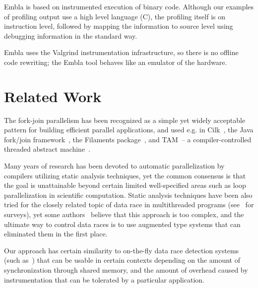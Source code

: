 \documentclass{acm_proc_article-sp}
\begin{document}
Embla is based on instrumented execution of binary code. Although
our examples of profiling output use a high level language (C),
the profiling itself is on instruction level, followed by 
mapping the information to source level using debugging information 
in the standard way.

Embla uses the Valgrind instrumentation infrastructure, so there
is no offline code rewriting; the Embla tool behaves like an emulator
of the hardware.

\section{Related Work}

The fork-join parallelism has been recognized as a simple yet widely
acceptable pattern for building efficient parallel applications, and used e.g. in
Cilk~\cite{BJKLR96}, the Java fork/join framework~\cite{Lea00}, the
Filaments package~\cite{LF00}, and {TAM}~-- a compiler-controlled
threaded abstract machine~\cite{CGSE93,GSC95}. 

Many years of research has been devoted to automatic parallelization
by compilers utilizing static analysis techniques, yet the common
consensus is that the goal is unattainable beyond certain limited
well-specified areas such as loop parallelization in scientific
computation. Static analysis techniques have been also tried for the
closely related topic of data race in multithreaded programs
(see~\cite{Rinard01,NAW06} for surveys), yet some
authors~\cite{Rinard01} believe that this approach is too complex, and
the ultimate way to control data races is to use augmented type systems
that can eliminated them in the first place.

Our approach has certain similarity to on-the-fly data race detection
systems (such as~\cite{MellorCrummey91,SBNSA97,HRY02}) that can be
usable in certain contexts depending on the amount of synchronization
through shared memory, and the amount of overhead caused by instrumentation that
can be tolerated by a particular application.



\end{document}

